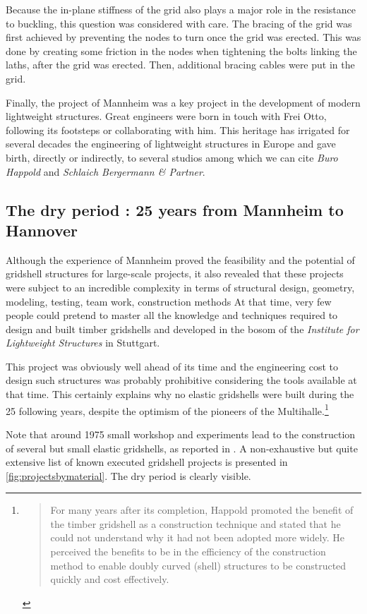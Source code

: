 Because the in-plane stiffness of the grid also plays a major role in the resistance to buckling, this question was considered with care. The bracing of the grid was first achieved by preventing the nodes to turn once the grid was erected. This was done by creating some friction in the nodes when tightening the bolts linking the laths, after the grid was erected. Then, additional bracing cables were put in the grid.

Finally, the project of Mannheim was a key project in the development of modern lightweight structures. Great engineers were born in touch with Frei Otto, following its footsteps or collaborating with him. This heritage has irrigated for several decades the engineering of lightweight structures in Europe and gave birth, directly or indirectly, to several studios among which we can cite \emph{Buro Happold} and \emph{Schlaich Bergermann \& Partner}.

\subsection{The dry period : 25 years from Mannheim to Hannover}

Although the experience of Mannheim proved the feasibility and the potential of gridshell structures for large-scale projects, it also revealed that these projects were subject to an incredible complexity in terms of structural design, geometry, modeling, testing, team work, construction methods \telp{} At that time, very few people could pretend to master all the knowledge and techniques required to design and built timber gridshells and developed in the bosom of the \emph{Institute for Lightweight Structures} in Stuttgart. 

This project was obviously well ahead of its time and the engineering cost to design such structures was probably prohibitive considering the tools available at that time. This certainly explains why no elastic gridshells were built during the 25 following years, despite the optimism of the pioneers of the Multihalle.\footnote{\blockcquote[]{Harris2003}{For many years after its completion, Happold promoted the benefit of the timber gridshell as a construction technique and stated that he could not understand why it had not been adopted more widely. He perceived the benefits to be in the efficiency of the construction method to enable doubly curved (shell) structures to be constructed quickly and cost effectively.}.}

Note that around 1975 small workshop and experiments lead to the construction of several but small elastic gridshells, as reported in \cite{IL10}. A non-exhaustive but quite extensive list of known executed gridshell projects is presented in \cref{fig:projectsbymaterial}. The dry period is clearly visible.

